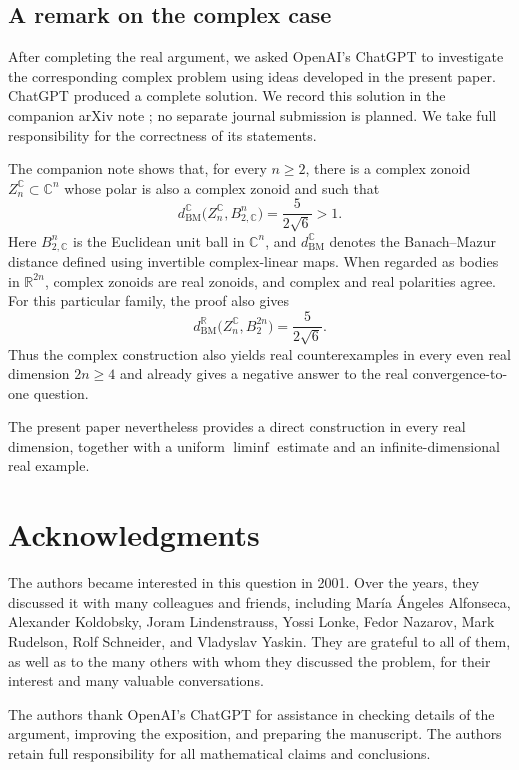 \documentclass[11pt]{article}
\theoremstyle{definition}
\theoremstyle{remark}
\begin{document}
\subsection{A remark on the complex case}\label{complex}


After completing the real argument, we asked OpenAI's ChatGPT to
investigate the corresponding complex problem using ideas developed
in the present paper.  ChatGPT produced a complete solution.  We record this solution in the
companion arXiv note \cite{RyaboginZvavitchComplex}; no separate
journal submission is planned.  We take full responsibility for the
correctness of its statements.

The companion note shows that, for every $n\geq2$, there is a complex
zonoid $Z_n^{\mathbb C}\subset\mathbb C^n$ whose polar is also a
complex zonoid and such that
\[
 d_{\mathrm{BM}}^{\mathbb C}
 \bigl(Z_n^{\mathbb C},B_{2,\mathbb C}^n\bigr)
 =\frac{5}{2\sqrt6}>1.
\]
Here $B_{2,\mathbb C}^n$ is the Euclidean unit ball in $\mathbb C^n$, and
$d_{\mathrm{BM}}^{\mathbb C}$ denotes the Banach--Mazur distance defined
using invertible complex-linear maps. 
When regarded as bodies in $\mathbb R^{2n}$, complex zonoids are real
zonoids, and complex and real polarities agree.  For this particular
family, the proof also gives
\[
 d_{\mathrm{BM}}^{\mathbb R}
 \bigl(Z_n^{\mathbb C},B_2^{2n}\bigr)
 =\frac{5}{2\sqrt6}.
\]
Thus the complex construction also yields real counterexamples in
every even real dimension $2n \ge 4$ and already gives a negative answer to the real
convergence-to-one question.

The present paper nevertheless provides a direct construction in
every real dimension, together with a uniform $\liminf$ estimate and
an infinite-dimensional real example.


\section*{Acknowledgments}

The authors became interested in this question in 2001.  Over
the years, they discussed it with many colleagues and friends,
including Mar\'ia \'Angeles Alfonseca, Alexander Koldobsky, Joram
Lindenstrauss, Yossi Lonke, Fedor Nazarov, Mark Rudelson, Rolf
Schneider, and Vladyslav Yaskin.  They are grateful to all of them, as
well as to the many others with whom they discussed the problem, for
their interest and many valuable conversations.

The authors thank OpenAI's ChatGPT for  assistance in checking
details of the argument, improving the exposition, and preparing the
manuscript.  The authors retain full responsibility for all
mathematical claims and conclusions.
\end{document}
